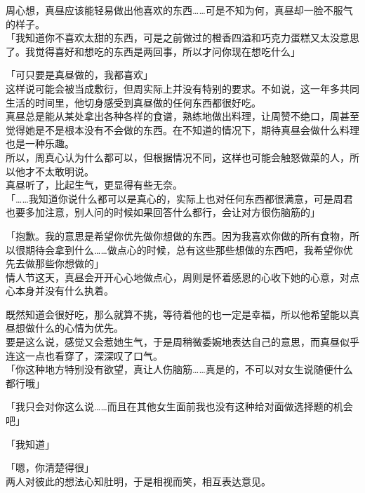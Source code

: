 周心想，真昼应该能轻易做出他喜欢的东西……可是不知为何，真昼却一脸不服气的样子。\\

「我知道你不喜欢太甜的东西，可是之前做过的橙香四溢和巧克力蛋糕又太没意思了。我觉得喜好和想吃的东西是两回事，所以才问你现在想吃什么」

「可只要是真昼做的，我都喜欢」\\

这样说可能会被当成敷衍，但周实际上并没有特别的要求。不如说，这一年多共同生活的时间里，他切身感受到真昼做的任何东西都很好吃。\\

真昼总是能从某处拿出各种各样的食谱，熟练地做出料理，让周赞不绝口，周甚至觉得她是不是根本没有不会做的东西。在不知道的情况下，期待真昼会做什么料理也是一种乐趣。\\

所以，周真心认为什么都可以，但根据情况不同，这样也可能会触怒做菜的人，所以他才不太敢明说。\\

真昼听了，比起生气，更显得有些无奈。\\

「……我知道你说什么都可以是真心的，实际上也对任何东西都很满意，可是周君也要多加注意，别人问的时候如果回答什么都行，会让对方很伤脑筋的」

「抱歉。我的意思是希望你优先做你想做的东西。因为我喜欢你做的所有食物，所以很期待会拿到什么……做点心的时候，总有这些那些想做的东西吧，我希望你优先去做那些你想做的」\\

情人节这天，真昼会开开心心地做点心，周则是怀着感恩的心收下她的心意，对点心本身并没有什么执着。

既然知道会很好吃，那么就算不挑，等待着他的也一定是幸福，所以他希望能以真昼想做什么的心情为优先。\\

要是这么说，感觉又会惹她生气，于是周稍微委婉地表达自己的意思，而真昼似乎连这一点也看穿了，深深叹了口气。\\

「你这种地方特别没有欲望，真让人伤脑筋……真是的，不可以对女生说随便什么都行哦」

「我只会对你这么说……而且在其他女生面前我也没有这种给对面做选择题的机会吧」

「我知道」

「嗯，你清楚得很」\\

两人对彼此的想法心知肚明，于是相视而笑，相互表达意见。\\

